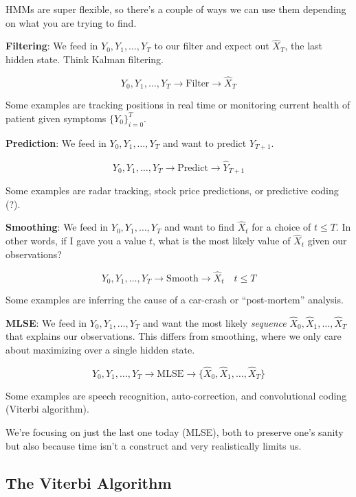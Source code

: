 \documentclass[11 pt]{scrartcl}
\begin{document}
HMMs are super flexible, so there's a couple of ways we can use them depending on what you are trying to find. 

\begin{itemize}
    \ii \textbf{Filtering}: We feed in $Y_0, Y_1, \dots, Y_T$ to our filter and expect out $\hat{X}_T$, the last hidden state. Think Kalman filtering. 

    \[ Y_0, Y_1, \dots, Y_T \rightarrow \boxed{\text{Filter}} \rightarrow \hat{X}_T\] 

    Some examples are tracking positions in real time or monitoring current health of patient given symptoms $\{Y_0\}_{i=0}^T$. 

    \ii \textbf{Prediction}: We feed in $Y_0, Y_1, \dots, Y_T$ and want to predict $\hat{Y}_{T+1}$. 
    
    \[ Y_0, Y_1, \dots, Y_T \rightarrow \boxed{\text{Predict}} \rightarrow \hat{Y}_{T+1}\] 

    Some examples are radar tracking, stock price predictions, or predictive coding (?). 

    \ii \textbf{Smoothing}: We feed in $Y_0, Y_1, \dots, Y_T$ and want to find $\hat{X}_t$ for a choice of $t \leq T$. In other words, if I gave you a value $t$, what is the most likely value of $\hat{X}_t$ given our observations? 

    \[ Y_0, Y_1, \dots, Y_T \rightarrow \boxed{\text{Smooth}} \rightarrow \hat{X}_t \quad t\leq T\] 
    
    Some examples are inferring the cause of a car-crash or ``post-mortem'' analysis. 

    \ii \textbf{MLSE}: We feed in $Y_0, Y_1, \dots, Y_T$ and want the most likely \emph{sequence} $\hat{X}_0, \hat{X}_1, \dots, \hat{X}_T$ that explains our observations. This differs from smoothing, where we only care about maximizing over a single hidden state. 

    \[ Y_0, Y_1, \dots, Y_T \rightarrow \boxed{\text{MLSE}} \rightarrow \{\hat{X}_0, \hat{X}_1, \dots, \hat{X}_T\} \]

    Some examples are speech recognition, auto-correction, and convolutional coding (Viterbi algorithm).
\end{itemize}

We're focusing on just the last one today (MLSE), both to preserve one's sanity but also because time isn't a construct and very realistically limits us. 

\subsection{The Viterbi Algorithm}
\end{document}
